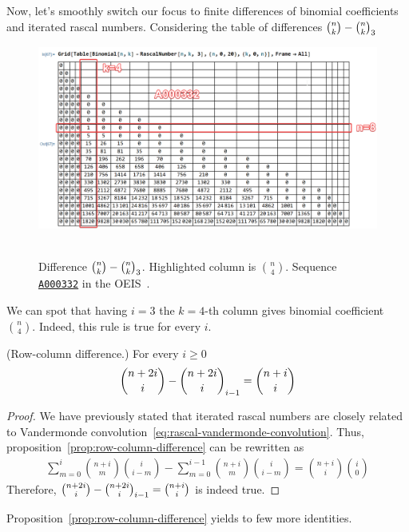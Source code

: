 Now, let's smoothly switch our focus to finite differences of binomial coefficients and iterated rascal numbers.
Considering the table of differences $\binom{n}{k}-\binom{n}{k}_{3}$
\begin{figure}[H]
    \centering
    \includegraphics[width=1\textwidth]{img/01_Difference_Binomial_Rascal_i_3_BinomialCoefficients}
    ~\caption{Difference $\binom{n}{k}-\binom{n}{k}_{3}$.
    Highlighted column is $\binom{n}{4}$.
    Sequence \href{https://oeis.org/A000332}{\texttt{A000332}} in the OEIS~\cite{sloane2009binomial}.}
    \label{fig:difference-binomial-rascal-i-3}
\end{figure}
We can spot that having $i=3$ the $k=4$-th column gives binomial coefficient $\binom{n}{4}$.
Indeed, this rule is true for every $i$.
\begin{proposition}
    \label{prop:row-column-difference}
    (Row-column difference.) For every $i\geq0$
    \begin{align*}
        \binom{n+2i}{i} - \binom{n+2i}{i}_{i-1} = \binom{n+i}{i}
    \end{align*}
    \begin{proof}
        We have previously stated that iterated rascal numbers are
        closely related to Vandermonde convolution~\eqref{eq:rascal-vandermonde-convolution}.
        Thus, proposition~\eqref{prop:row-column-difference} can be rewritten as
        \begin{align*}
            \sum_{m=0}^{i} \binom{n+i}{m} \binom{i}{i-m} - \sum_{m=0}^{i-1} \binom{n+i}{m} \binom{i}{i-m} = \binom{n+i}{i} \binom{i}{0}
        \end{align*}
        Therefore, $\binom{n+2i}{i} - \binom{n+2i}{i}_{i-1} = \binom{n+i}{i}$ is indeed true.
    \end{proof}
\end{proposition}
Proposition~\eqref{prop:row-column-difference} yields to few more identities.
